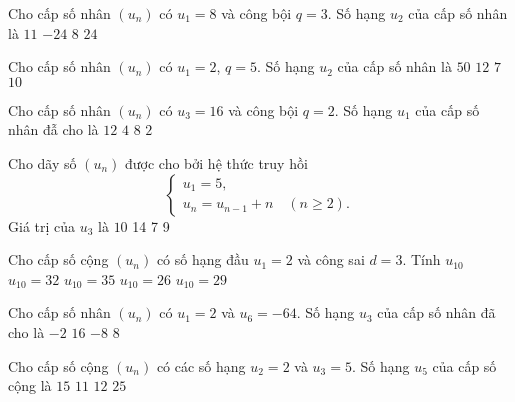 \begin{ex}
Cho cấp số nhân $(u_n)$ có $u_1=8$ và công bội $q=3$. Số hạng $u_2$ của cấp số nhân là
\choice
{$11$}
{$-24$}
{$8$}
{\True $24$}
\end{ex}
\begin{ex}
Cho cấp số nhân $(u_n)$ có $u_1=2$, $q=5$. Số hạng $u_2$ của cấp số nhân là
\choice
{$50$}
{$12$}
{$7$}
{\True $10$}
\end{ex}
\begin{ex}
Cho cấp số nhân $(u_n)$ có $u_3=16$ và công bội $q=2$. Số hạng $u_1$ của cấp số nhân đẫ cho là
\choice
{$12$}
{\True $4$}
{$8$}
{$2$}
\end{ex}
\begin{ex}
Cho dãy số $(u_n)$ được cho bởi hệ thức truy hồi
\[\begin{cases}
u_1=5,\\
u_n=u_{n-1}+n \quad (n\ge 2).
\end{cases}\]
Giá trị của $u_3$ là
\choice
{\True $10$}
{14}
{7}
{9}
\end{ex}
\begin{ex}
Cho cấp số cộng $(u_n)$ có số hạng đầu $u_1=2$ và công sai $d=3$. Tính $u_{10}$
\choice
{$u_{10}=32$}
{$u_{10}=35$}
{$u_{10}=26$}
{\True $u_{10}=29$}
\end{ex}
\begin{ex}
Cho cấp số nhân $(u_n)$ có $u_1=2$ và $u_6=-64$. Số hạng $u_3$ của cấp số nhân đã cho là 
\choice
{$-2$}
{$16$}
{$-8$}
{\True $8$}
\end{ex}
\begin{ex}
Cho cấp số cộng $(u_n)$ có các số hạng $u_2=2$ và $u_3=5$. Số hạng $u_5$ của cấp số cộng là
\choice
{$15$}
{\True $11$}
{$12$}
{$25$}
\end{ex}

